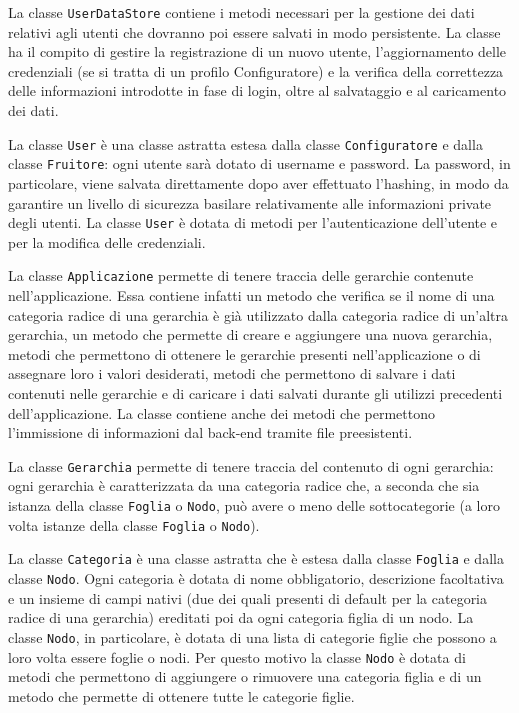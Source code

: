 La classe \texttt{UserDataStore} contiene i metodi necessari per la gestione dei dati relativi agli utenti che dovranno poi essere salvati in modo persistente. La classe ha il compito di gestire la registrazione di un nuovo utente, l'aggiornamento delle credenziali (se si tratta di un profilo Configuratore) e la verifica della correttezza delle informazioni introdotte in fase di login, oltre al salvataggio e al caricamento dei dati. 

La classe \texttt{User} è una classe astratta estesa dalla classe \texttt{Configuratore} e dalla classe \texttt{Fruitore}: ogni utente sarà dotato di username e password. La password, in particolare, viene salvata direttamente dopo aver effettuato l'hashing, in modo da garantire un livello di sicurezza basilare relativamente alle informazioni private degli utenti. La classe \texttt{User} è dotata di metodi per l'autenticazione dell'utente e per la modifica delle credenziali.

La classe \texttt{Applicazione} permette di tenere traccia delle gerarchie contenute nell'applicazione. 
Essa contiene infatti un metodo che verifica se il nome di una categoria radice di una gerarchia è già utilizzato dalla categoria radice di un'altra gerarchia, un metodo che permette di creare e aggiungere una nuova gerarchia, metodi che permettono di ottenere le gerarchie presenti nell'applicazione o di assegnare loro i valori desiderati, metodi che permettono di salvare i dati contenuti nelle gerarchie e di caricare i dati salvati durante gli utilizzi precedenti dell'applicazione. 
La classe contiene anche dei metodi che permettono l'immissione di informazioni dal back-end tramite file preesistenti. 

La classe \texttt{Gerarchia} permette di tenere traccia del contenuto di ogni gerarchia: ogni gerarchia è caratterizzata da una categoria radice che, a seconda che sia istanza della classe \texttt{Foglia} o \texttt{Nodo}, può avere o meno delle sottocategorie (a loro volta istanze della classe \texttt{Foglia} o \texttt{Nodo}). 

La classe \texttt{Categoria} è una classe astratta che è estesa dalla classe \texttt{Foglia} e dalla classe \texttt{Nodo}. Ogni categoria è dotata di nome obbligatorio, descrizione facoltativa e un insieme di campi nativi (due dei quali presenti di default per la categoria radice di una gerarchia) ereditati poi da ogni categoria figlia di un nodo.
La classe \texttt{Nodo}, in particolare, è dotata di una lista di categorie figlie che possono a loro volta essere foglie o nodi. Per questo motivo la classe \texttt{Nodo} è dotata di metodi che permettono di aggiungere o rimuovere una categoria figlia e di un metodo che permette di ottenere tutte le categorie figlie.

